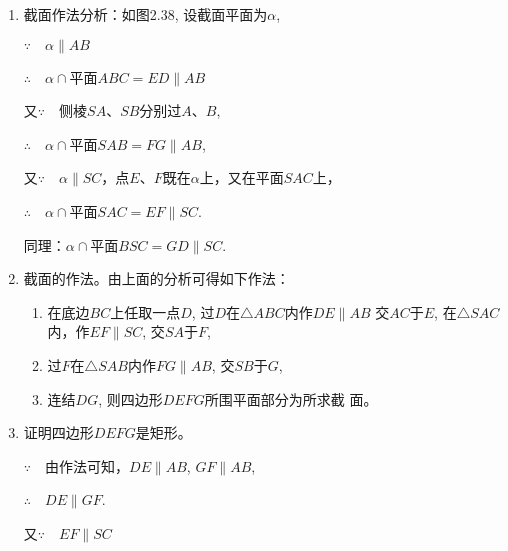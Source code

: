 \begin{figure}[htp]
    \centering
{}
    \caption{}
\end{figure}

\begin{solution}
\begin{enumerate}
    \item 截面作法分析：如图2.38, 设截面平面为$\alpha$, 
    
$\because\quad \alpha\parallel AB$

$\therefore\quad \alpha\cap$平面$ABC=ED\parallel AB$

又$\because\quad $侧棱$SA$、$SB$分别过$A$、$B$,

$\therefore\quad \alpha\cap$平面$SAB=FG\parallel AB$,

又$\because\quad \alpha\parallel SC$，点$E$、$F$既在$\alpha$上，又在平面$SAC$上，

$\therefore\quad \alpha\cap$平面$SAC=EF\parallel SC$.

同理：$\alpha\cap$平面$BSC=GD\parallel SC$.

\item 截面的作法。由上面的分析可得如下作法：
\begin{enumerate}
    \item 在底边$BC$上任取一点$D$, 过$D$在$\triangle ABC$内作$DE\parallel AB$
    交$AC$于$E$, 在$\triangle SAC$内，作$EF\parallel SC$, 交$SA$于$F$,
    \item  过$F$在$\triangle SAB$内作$FG\parallel AB$, 交$SB$于$G$, 
    \item 连结$DG$, 则四边形$DEFG$所围平面部分为所求截
    面。
\end{enumerate}

\item 证明四边形$DEFG$是矩形。


$\because\quad $由作法可知，$DE\parallel AB$, $GF\parallel AB$, 

$\therefore\quad DE\parallel GF$.

又$\because\quad EF\parallel SC$


\end{enumerate}
\end{solution}
